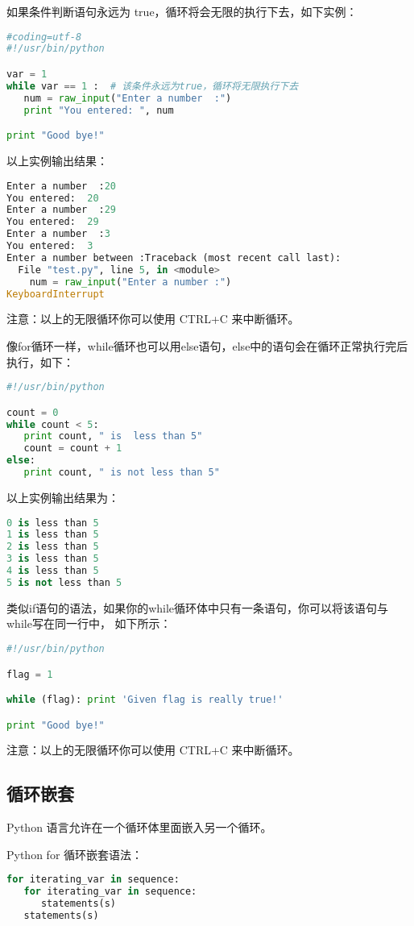 如果条件判断语句永远为 true，循环将会无限的执行下去，如下实例：
\begin{lstlisting}[language=Python]
#coding=utf-8
#!/usr/bin/python

var = 1
while var == 1 :  # 该条件永远为true，循环将无限执行下去
   num = raw_input("Enter a number  :")
   print "You entered: ", num

print "Good bye!"
\end{lstlisting}
以上实例输出结果：
\begin{lstlisting}[language=Python]
Enter a number  :20
You entered:  20
Enter a number  :29
You entered:  29
Enter a number  :3
You entered:  3
Enter a number between :Traceback (most recent call last):
  File "test.py", line 5, in <module>
    num = raw_input("Enter a number :")
KeyboardInterrupt
\end{lstlisting}
注意：以上的无限循环你可以使用 CTRL+C 来中断循环。

像for循环一样，while循环也可以用else语句，else中的语句会在循环正常执行完后执行，如下：
\begin{lstlisting}[language=Python]
#!/usr/bin/python

count = 0
while count < 5:
   print count, " is  less than 5"
   count = count + 1
else:
   print count, " is not less than 5"
\end{lstlisting}
以上实例输出结果为：
\begin{lstlisting}[language=Python]
0 is less than 5
1 is less than 5
2 is less than 5
3 is less than 5
4 is less than 5
5 is not less than 5
\end{lstlisting}

类似if语句的语法，如果你的while循环体中只有一条语句，你可以将该语句与while写在同一行中， 如下所示：
\begin{lstlisting}[language=Python]
#!/usr/bin/python

flag = 1

while (flag): print 'Given flag is really true!'

print "Good bye!"
\end{lstlisting}
注意：以上的无限循环你可以使用 CTRL+C 来中断循环。


\subsection{循环嵌套}
Python 语言允许在一个循环体里面嵌入另一个循环。

Python for 循环嵌套语法：
\begin{lstlisting}[language=Python]
for iterating_var in sequence:
   for iterating_var in sequence:
      statements(s)
   statements(s)
\end{lstlisting}


